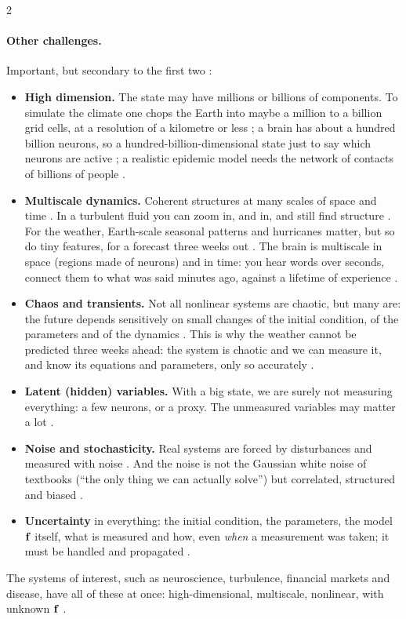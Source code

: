 \begin{paracol}{2}
\paragraph{Other challenges.} Important, but secondary to the first two :
\begin{itemize}
  \item \textbf{High dimension.} The state may have millions or billions of components. To simulate
        the climate one chops the Earth into maybe a million to a billion grid cells, at a resolution
        of a kilometre or less ; a brain has about a hundred billion neurons, so a
        hundred-billion-dimensional state just to say which neurons are active ; a
        realistic epidemic model needs the network of contacts of billions of people
        .
  \item \textbf{Multiscale dynamics.} Coherent structures at many scales of space and time
        . In a turbulent fluid you can zoom in, and in, and still find structure
        . For the weather, Earth-scale seasonal patterns and hurricanes matter, but so
        do tiny features, for a forecast three weeks out . The brain is multiscale in
        space (regions made of neurons) and in time: you hear words over seconds, connect them to what
        was said minutes ago, against a lifetime of experience .
  \item \textbf{Chaos and transients.} Not all nonlinear systems are chaotic, but many are: the
        future depends sensitively on small changes of the initial condition, of the parameters and of
        the dynamics . This is why the weather cannot be predicted three weeks ahead:
        the system is chaotic and we can measure it, and know its equations and parameters, only so
        accurately .
  \item \textbf{Latent (hidden) variables.} With a big state, we are surely not measuring everything:
        a few neurons, or a proxy. The unmeasured variables may matter a lot .
  \item \textbf{Noise and stochasticity.} Real systems are forced by disturbances and measured with
        noise . And the noise is not the Gaussian white noise of
        textbooks (``the only thing we can actually solve'') but correlated, structured and biased
        .
  \item \textbf{Uncertainty} in everything: the initial condition, the parameters, the model $\mathbf{f}$
        itself, what is measured and how, even \emph{when} a measurement was taken; it must be handled
        and propagated .
\end{itemize}
The systems of interest, such as neuroscience, turbulence, financial markets and disease, have all of
these at once: high-dimensional, multiscale, nonlinear, with unknown $\mathbf{f}$ .


\end{paracol}
